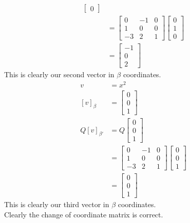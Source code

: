 \documentclass[answers,12pt,addpoints]{exam}
\begin{document}
\begin{questions}
\begin{solution}
\begin{align*}
\begin{bmatrix}
                0
            \end{bmatrix}\\
            &= \begin{bmatrix}
                0 & -1 & 0\\
                1 & 0 & 0\\
                -3 & 2 & 1
            \end{bmatrix}\begin{bmatrix}
                0\\
                1\\
                0
            \end{bmatrix}\\
            &= \begin{bmatrix}
                -1 \\
                0\\
                2
            \end{bmatrix}
        \end{align*}
        This is clearly our second vector in $\beta$ coordinates.
        \begin{align*}
            v &= x^2\\
            [v]_{\beta} &= \begin{bmatrix}
                0 \\
                0\\
                1
            \end{bmatrix}   \\
            Q[v]_{\beta'} &= Q\begin{bmatrix}
                0\\
                0\\
                1
            \end{bmatrix}\\
            &= \begin{bmatrix}
                0 & -1 & 0\\
                1 & 0 & 0\\
                -3 & 2 & 1
            \end{bmatrix}\begin{bmatrix}
                0\\
                0\\
                1
            \end{bmatrix}\\
            &= \begin{bmatrix}
                0 \\
                0\\
                1
            \end{bmatrix}
        \end{align*}
        This is clearly our third vector in $\beta$ coordinates.\\
        Clearly the change of coordinate matrix is correct.
    \end{solution}


\end{questions}
\end{document}
